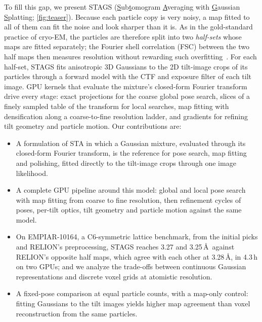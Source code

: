 To fill this gap, we present STAGS (\underline{S}ub\underline{t}omogram \underline{A}veraging with \underline{G}aussian \underline{S}platting; \cref{fig:teaser}).
Because each particle copy is very noisy, a map fitted to all of them can fit the noise and look sharper than it is.
As in the gold-standard practice of cryo-EM, the particles are therefore split into two \emph{half-sets} whose maps are fitted separately; the Fourier shell correlation (FSC) between the two half maps then measures resolution without rewarding such overfitting~\cite{scheres2012relion,rosenthal2003fsc}.
For each half-set, STAGS fits anisotropic 3D Gaussians to the 2D tilt-image crops of its particles through a forward model with the CTF and exposure filter of each tilt image.
GPU kernels that evaluate the mixture's closed-form Fourier transform drive every stage: exact projections for the coarse global pose search, slices of a finely sampled table of the transform for local searches, map fitting with densification along a coarse-to-fine resolution ladder, and gradients for refining tilt geometry and particle motion.
Our contributions are:
\begin{itemize}
\item A formulation of STA in which a Gaussian mixture, evaluated through its closed-form Fourier transform, is the reference for pose search, map fitting and polishing, fitted directly to the tilt-image crops through one image likelihood.
\item A complete GPU pipeline around this model: global and local pose search with map fitting from coarse to fine resolution, then refinement cycles of poses, per-tilt optics, tilt geometry and particle motion against the same model.
\item On EMPIAR-10164, a C6-symmetric lattice benchmark, from the initial picks and RELION's preprocessing, STAGS reaches 3.27 and 3.25\,\AA\ against RELION's opposite half maps, which agree with each other at 3.28\,\AA, in 4.3\,h on two GPUs; and we analyze the trade-offs between continuous Gaussian representations and discrete voxel grids at atomistic resolution.
\item A fixed-pose comparison at equal particle counts, with a map-only control: fitting Gaussians to the tilt images yields higher map agreement than voxel reconstruction from the same particles.
\end{itemize}
